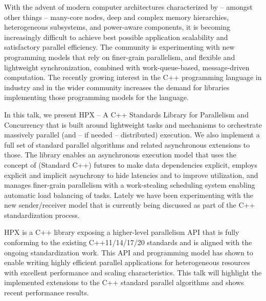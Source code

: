 With the advent of modern computer architectures characterized by -- amongst other things -- many-core nodes, deep and complex memory hierarchies, heterogeneous subsystems, and power-aware components, it is becoming increasingly difficult to achieve best possible application scalability and satisfactory parallel efficiency. The community is experimenting with new programming models that rely on finer-grain parallelism, and flexible and lightweight synchronization, combined with work-queue-based, message-driven computation. The recently growing interest in the C++ programming language in industry and in the wider community increases the demand for libraries implementing those programming models for the language.

In this talk, we present HPX -- A C++ Standards Library for Parallelism and Concurrency that is built around lightweight tasks and mechanisms to orchestrate massively parallel (and -- if needed -- distributed) execution. We also implement a full set of standard parallel algorithms and related asynchronous extensions to those. The library enables an asynchronous execution model that uses the concept of (Standard C++) futures to make data dependencies explicit, employs explicit and implicit asynchrony to hide latencies and to improve utilization, and manages finer-grain parallelism with a work-stealing scheduling system enabling automatic load balancing of tasks. Lately we have been experimenting with the new sender/receiver model that is currently being discussed as part of the C++ standardization process.

HPX is a C++ library exposing a higher-level parallelism API that is fully conforming to the existing C++11/14/17/20 standards and is aligned with the ongoing standardization work. This API and programming model has shown to enable writing highly efficient parallel applications for heterogeneous resources with excellent performance and scaling characteristics. This talk will highlight the implemented extensions to the C++ standard parallel algorithms and shows recent performance results. 